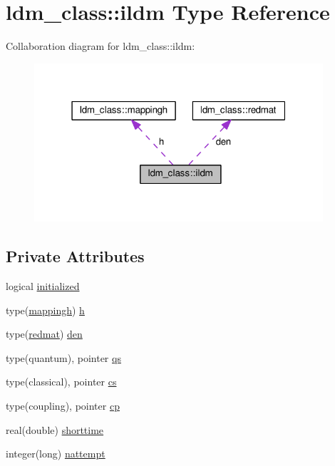 \hypertarget{structldm__class_1_1ildm}{\section{ldm\+\_\+class\+:\+:ildm Type Reference}
\label{structldm__class_1_1ildm}
}


Collaboration diagram for ldm\+\_\+class\+:\+:ildm\+:\nopagebreak
\begin{figure}[H]
\begin{center}
\leavevmode
\includegraphics[width=304pt]{structldm__class_1_1ildm__coll__graph}
\end{center}
\end{figure}
\subsection*{Private Attributes}
\begin{DoxyCompactItemize}
\item 
logical \hyperlink{structldm__class_1_1ildm_a11801eac8d58dc9fd957c5571ce5e70f}{initialized}
\item 
type(\hyperlink{structldm__class_1_1mappingh}{mappingh}) \hyperlink{structldm__class_1_1ildm_a9846536e7762bc561a73387ae3121c31}{h}
\item 
type(\hyperlink{structldm__class_1_1redmat}{redmat}) \hyperlink{structldm__class_1_1ildm_af95bdbf6c7a5dee12767779ae3acb1ce}{den}
\item 
type(quantum), pointer \hyperlink{structldm__class_1_1ildm_a32b4a75ab3169c6ebc44f889955c87f9}{qs}
\item 
type(classical), pointer \hyperlink{structldm__class_1_1ildm_a4fda2da002e3a746461bebcb8127125b}{cs}
\item 
type(coupling), pointer \hyperlink{structldm__class_1_1ildm_af25caa3ca4b3d9fc7bc6e29f39c0733f}{cp}
\item 
real(double) \hyperlink{structldm__class_1_1ildm_af581a7e8d199abfdab3ac80bcec97433}{shorttime}
\item 
integer(long) \hyperlink{structldm__class_1_1ildm_aa96800511a6cd823153cc5aba5d5f556}{nattempt}
\end{DoxyCompactItemize}


